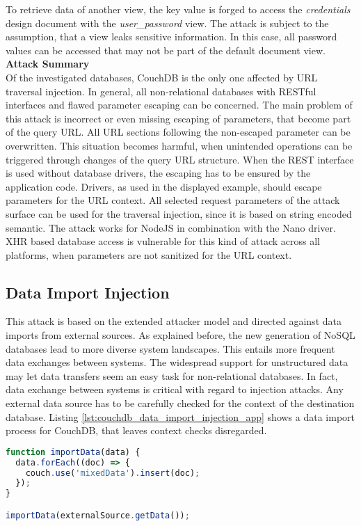 To retrieve data of another view, the key value is forged to access the \emph{credentials} design document with the \emph{user\_password} view. The attack is subject to the assumption, that a view leaks sensitive information. In this case, all password values can be accessed that may not be part of the default document view. \\

\textbf{Attack Summary} \\
Of the investigated databases, CouchDB is the only one affected by URL traversal injection. In general, all non-relational databases with RESTful interfaces and flawed parameter escaping can be concerned. The main problem of this attack is incorrect or even missing escaping of parameters, that become part of the query URL. All URL sections following the non-escaped parameter can be overwritten. This situation becomes harmful, when unintended operations can be triggered through changes of the query URL structure. When the REST interface is used without database drivers, the escaping has to be ensured by the application code. Drivers, as used in the displayed example, should escape parameters for the URL context. All selected request parameters of the attack surface can be used for the traversal injection, since it is based on string encoded semantic. The attack works for NodeJS in combination with the Nano driver. XHR based database access is vulnerable for this kind of attack across all platforms, when parameters are not sanitized for the URL context. 

\subsection{Data Import Injection}
This attack is based on the extended attacker model and directed against data imports from external sources. As explained before, the new generation of NoSQL databases lead to more diverse system landscapes. This entails more frequent data exchanges between systems. The widespread support for unstructured data may let data transfers seem an easy task for non-relational databases. In fact, data exchange between systems is critical with regard to injection attacks. Any external data source has to be carefully checked for the context of the destination database. Listing \ref{lst:couchdb_data_import_injection_app} shows a data import process for CouchDB, that leaves context checks disregarded.\\

\begin{lstlisting}[caption={Vulnerable NodeJS example for data import injection on CouchDB}, label={lst:couchdb_data_import_injection_app}, language=JavaScript]
function importData(data) {
  data.forEach((doc) => {
    couch.use('mixedData').insert(doc);
  });
}

importData(externalSource.getData());
\end{lstlisting}

